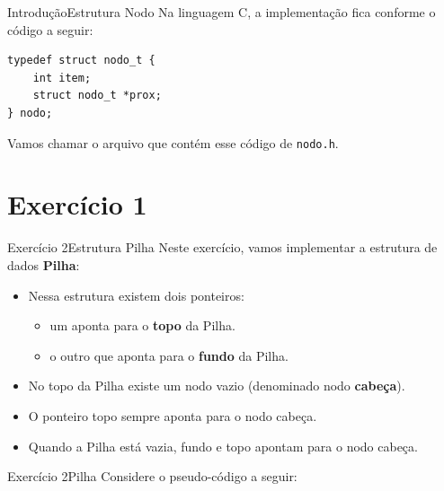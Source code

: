 \documentclass[aspectratio=169]{beamer}
\begin{document}
\begin{frame}[fragile]{Introdução}{Estrutura Nodo}
Na linguagem C, a implementação fica conforme o código a seguir:
\begin{lstlisting}[style=CStyle]
typedef struct nodo_t {
    int item;
    struct nodo_t *prox; 
} nodo;
\end{lstlisting}  
Vamos chamar o arquivo que contém esse código de \verb|nodo.h|.
\end{frame}

\section{Exercício 1}

\begin{frame}[fragile]{Exercício 2}{Estrutura Pilha}
Neste exercício, vamos implementar a estrutura de dados {\bf Pilha}:
\begin{itemize}
 \item Nessa estrutura existem dois ponteiros:
 \begin{itemize}
    \item um aponta para o {\bf topo} da Pilha.
    \item o outro que aponta para o {\bf fundo} da Pilha.
 \end{itemize}
 \item No topo da Pilha existe um nodo vazio (denominado nodo {\bf cabeça}).
 \item O ponteiro topo sempre aponta para o nodo cabeça.
 \item Quando a Pilha está vazia, fundo e topo apontam para o nodo cabeça.
\end{itemize}
\end{frame}


\begin{frame}[fragile]{Exercício 2}{Pilha}
Considere o pseudo-código a seguir:
\begin{algorithm}[H]
\caption{Pilha} 
\label{Pilha}
\end{algorithm} 
\end{frame}

\end{document}
